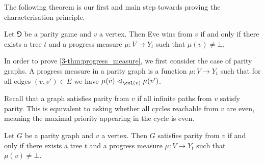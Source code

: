 The following theorem is our first and main step towards proving the characterisation principle.

\begin{theorem}
\label{3-thm:progress_measure}
Let $\Game$ be a parity game and $v$ a vertex.
Then Eve wins from $v$ if and only if there exists a tree $t$ and a progress measure $\mu : V \to Y_t$ such that $\mu(v) \neq \bot$.
\end{theorem}

In order to prove \cref{3-thm:progress_measure}, we first consider the case of parity graphs.
A progress measure in a parity graph is a function $\mu : V \to Y_t$ such that 
for all edges $(v,v') \in E$ we have $\mu(v) \vartriangleleft_{\col(v)} \mu(v')$.

Recall that a graph satisfies parity from $v$ if all infinite paths from $v$ satisfy parity.
This is equivalent to asking whether all cycles reachable from $v$ are even, meaning the maximal priority appearing in the cycle is even.

\begin{lemma}
\label{3-lem:progress_measure}
Let $G$ be a parity graph and $v$ a vertex.
Then $G$ satisfies parity from $v$ if and only if 
there exists a tree $t$ and a progress measure $\mu : V \to Y_t$ such that $\mu(v) \neq \bot$.
\end{lemma}


